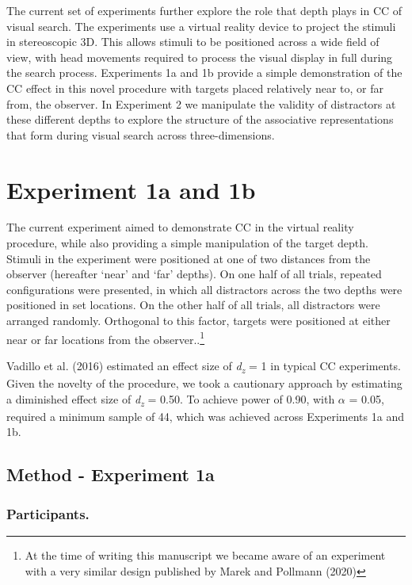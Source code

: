 \documentclass[
  english,
  man,floatsintext]{apa7}
\begin{document}
The current set of experiments further explore the role that depth plays in CC of visual search. The experiments use a virtual reality device to project the stimuli in stereoscopic 3D. This allows stimuli to be positioned across a wide field of view, with head movements required to process the visual display in full during the search process. Experiments 1a and 1b provide a simple demonstration of the CC effect in this novel procedure with targets placed relatively near to, or far from, the observer. In Experiment 2 we manipulate the validity of distractors at these different depths to explore the structure of the associative representations that form during visual search across three-dimensions.

\hypertarget{experiment-1a-and-1b}{%
\section{Experiment 1a and 1b}\label{experiment-1a-and-1b}}

The current experiment aimed to demonstrate CC in the virtual reality procedure, while also providing a simple manipulation of the target depth. Stimuli in the experiment were positioned at one of two distances from the observer (hereafter `near' and `far' depths). On one half of all trials, repeated configurations were presented, in which all distractors across the two depths were positioned in set locations. On the other half of all trials, all distractors were arranged randomly. Orthogonal to this factor, targets were positioned at either near or far locations from the observer..\footnote{At the time of writing this manuscript we became aware of an experiment with a very similar design published by Marek and Pollmann (2020)}

Vadillo et al. (2016) estimated an effect size of \emph{d\textsubscript{z}} = 1 in typical CC experiments. Given the novelty of the procedure, we took a cautionary approach by estimating a diminished effect size of \emph{d\textsubscript{z}} = 0.50. To achieve power of 0.90, with \(\alpha\) = 0.05, required a minimum sample of 44, which was achieved across Experiments 1a and 1b.

\hypertarget{method---experiment-1a}{%
\subsection{Method - Experiment 1a}\label{method---experiment-1a}}

\hypertarget{participants.}{%
\subsubsection{Participants.}\label{participants.}}
\end{document}
